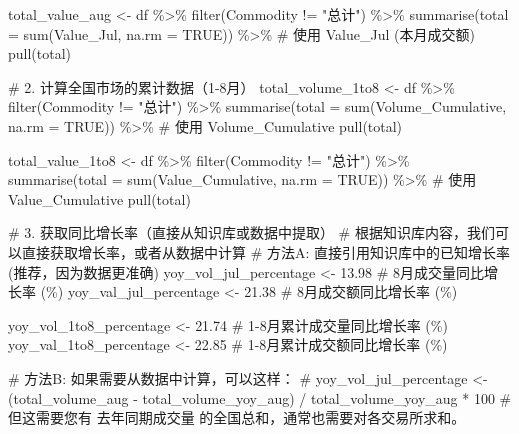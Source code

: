 \documentclass[
  letterpaper,
  DIV=11,
  numbers=noendperiod]{scrartcl}
\newenvironment{Shaded}{\begin{snugshade}}{\end{snugshade}}
\newcommand{\AttributeTok}[1]{\textcolor[rgb]{0.40,0.45,0.13}{#1}}
\newcommand{\CommentTok}[1]{\textcolor[rgb]{0.37,0.37,0.37}{#1}}
\newcommand{\ConstantTok}[1]{\textcolor[rgb]{0.56,0.35,0.01}{#1}}
\newcommand{\FloatTok}[1]{\textcolor[rgb]{0.68,0.00,0.00}{#1}}
\newcommand{\FunctionTok}[1]{\textcolor[rgb]{0.28,0.35,0.67}{#1}}
\newcommand{\NormalTok}[1]{\textcolor[rgb]{0.00,0.23,0.31}{#1}}
\newcommand{\OtherTok}[1]{\textcolor[rgb]{0.00,0.23,0.31}{#1}}
\newcommand{\SpecialCharTok}[1]{\textcolor[rgb]{0.37,0.37,0.37}{#1}}
\newcommand{\StringTok}[1]{\textcolor[rgb]{0.13,0.47,0.30}{#1}}
\begin{document}
\begin{Shaded}
\begin{Highlighting}[]
\NormalTok{total\_value\_aug }\OtherTok{\textless{}{-}}\NormalTok{ df }\SpecialCharTok{\%\textgreater{}\%}
  \FunctionTok{filter}\NormalTok{(Commodity }\SpecialCharTok{!=} \StringTok{"总计"}\NormalTok{) }\SpecialCharTok{\%\textgreater{}\%}
  \FunctionTok{summarise}\NormalTok{(}\AttributeTok{total =} \FunctionTok{sum}\NormalTok{(Value\_Jul, }\AttributeTok{na.rm =} \ConstantTok{TRUE}\NormalTok{)) }\SpecialCharTok{\%\textgreater{}\%}   \CommentTok{\# 使用 Value\_Jul (本月成交额)}
  \FunctionTok{pull}\NormalTok{(total)}

\CommentTok{\# 2. 计算全国市场的累计数据（1{-}8月）}
\NormalTok{total\_volume\_1to8 }\OtherTok{\textless{}{-}}\NormalTok{ df }\SpecialCharTok{\%\textgreater{}\%}
  \FunctionTok{filter}\NormalTok{(Commodity }\SpecialCharTok{!=} \StringTok{"总计"}\NormalTok{) }\SpecialCharTok{\%\textgreater{}\%}
  \FunctionTok{summarise}\NormalTok{(}\AttributeTok{total =} \FunctionTok{sum}\NormalTok{(Volume\_Cumulative, }\AttributeTok{na.rm =} \ConstantTok{TRUE}\NormalTok{)) }\SpecialCharTok{\%\textgreater{}\%}  \CommentTok{\# 使用 Volume\_Cumulative}
  \FunctionTok{pull}\NormalTok{(total)}

\NormalTok{total\_value\_1to8 }\OtherTok{\textless{}{-}}\NormalTok{ df }\SpecialCharTok{\%\textgreater{}\%}
  \FunctionTok{filter}\NormalTok{(Commodity }\SpecialCharTok{!=} \StringTok{"总计"}\NormalTok{) }\SpecialCharTok{\%\textgreater{}\%}
  \FunctionTok{summarise}\NormalTok{(}\AttributeTok{total =} \FunctionTok{sum}\NormalTok{(Value\_Cumulative, }\AttributeTok{na.rm =} \ConstantTok{TRUE}\NormalTok{)) }\SpecialCharTok{\%\textgreater{}\%}   \CommentTok{\# 使用 Value\_Cumulative}
  \FunctionTok{pull}\NormalTok{(total)}

\CommentTok{\# 3. 获取同比增长率（直接从知识库或数据中提取）}
\CommentTok{\# 根据知识库内容，我们可以直接获取增长率，或者从数据中计算}
\CommentTok{\# 方法A: 直接引用知识库中的已知增长率 (推荐，因为数据更准确)}
\NormalTok{yoy\_vol\_jul\_percentage }\OtherTok{\textless{}{-}} \FloatTok{13.98} \CommentTok{\# 8月成交量同比增长率 (\%)}
\NormalTok{yoy\_val\_jul\_percentage }\OtherTok{\textless{}{-}} \FloatTok{21.38} \CommentTok{\# 8月成交额同比增长率 (\%)}

\NormalTok{yoy\_vol\_1to8\_percentage }\OtherTok{\textless{}{-}} \FloatTok{21.74} \CommentTok{\# 1{-}8月累计成交量同比增长率 (\%)}
\NormalTok{yoy\_val\_1to8\_percentage }\OtherTok{\textless{}{-}} \FloatTok{22.85} \CommentTok{\# 1{-}8月累计成交额同比增长率 (\%)}

\CommentTok{\# 方法B: 如果需要从数据中计算，可以这样：}
\CommentTok{\# yoy\_vol\_jul\_percentage \textless{}{-} (total\_volume\_aug {-} total\_volume\_yoy\_aug) / total\_volume\_yoy\_aug * 100}
\CommentTok{\# 但这需要您有 \textquotesingle{}去年同期成交量\textquotesingle{} 的全国总和，通常也需要对各交易所求和。}


\end{Highlighting}
\end{Shaded}
\end{document}
